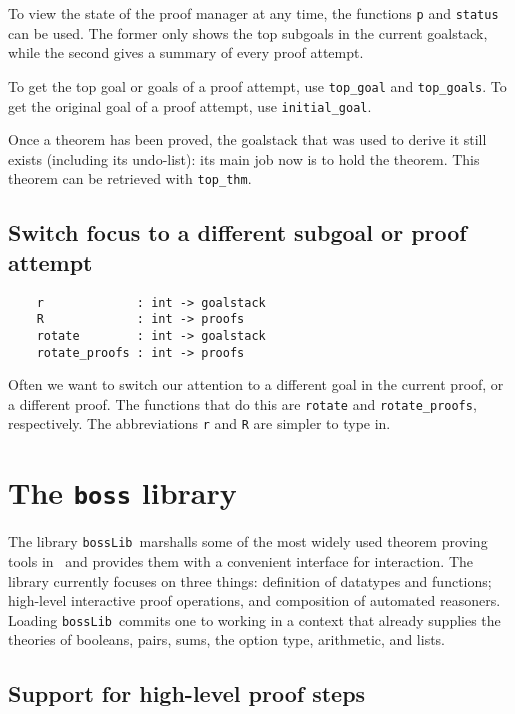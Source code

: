 To view the state of the proof manager at any time, the functions
\verb+p+ and \verb+status+ can be used. The former only shows
the top subgoals in the current goalstack, while the second gives a
summary of every proof attempt.

To get the top goal or goals of a proof attempt, use \verb+top_goal+
and \verb+top_goals+. To get the original goal of a proof attempt,
use \verb+initial_goal+.

Once a theorem has been proved, the goalstack that was used to derive it
still exists (including its undo-list): its main job now is to
hold the theorem. This theorem can be retrieved with
\verb+top_thm+.

\subsection{Switch focus to a different subgoal or proof attempt}

\begin{verbatim}
    r             : int -> goalstack
    R             : int -> proofs
    rotate        : int -> goalstack
    rotate_proofs : int -> proofs
\end{verbatim}

Often we want to switch our attention to a different goal in the current
proof, or a different proof. The functions that do this are
\verb+rotate+ and \verb+rotate_proofs+, respectively. The abbreviations
\verb+r+ and \verb+R+ are simpler to type in.

\section{The {\tt boss} library}
\label{sec:bossLib}
\newcommand\bossLib{{\tt bossLib}}

The library \bossLib\ marshalls some of the most widely used theorem
proving tools in \HOL\ and provides them with a convenient interface
for interaction. The library currently focuses on three things:
definition of datatypes and functions; high-level interactive proof
operations, and composition of automated reasoners. Loading \bossLib\
commits one to working in a context that already supplies the theories
of booleans, pairs, sums, the option type, arithmetic, and lists.


\subsection{Support for high-level proof steps}
\label{sec:high-level-proof-steps}

